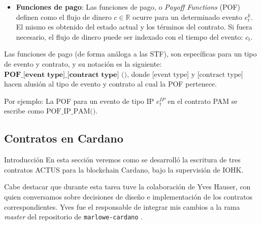 \documentclass{beamer}
\begin{document}
\begin{frame}
    \begin{itemize}
        \item \textbf{Funciones de pago}: Las funciones de pago, o \textit{Payoff Functions} (POF) definen como el flujo de dinero $c \in\mathbb{R}$ ocurre para un determinado evento $e^k_t$. El mismo es obtenido del estado actual y los términos del contrato. Si fuera necesario, el flujo de dinero puede ser indexado con el tiempo del evento: $c_t$.
    \end{itemize}
    \pause
    \vfill
    Las funciones de pago (de forma análoga a las STF), son específicas para un tipo de evento y contrato, y su notación es la siguiente: $\textbf{POF\_[event type]\_[contract type] ()}$, donde $\text{[event type]}$ y $\text{[contract type]}$ hacen alusión al tipo de evento y contrato al cual la POF pertenece.
    \medskip
    \pause

    Por ejemplo: La POF para un evento de tipo IP $e^{IP}_t$ en el contrato PAM se escribe como $\text{POF\_IP\_PAM()}$.

\end{frame}

\subsection{Contratos en Cardano}

\begin{frame}{Introducción}
En esta sección veremos como se desarrolló la escritura de tres contratos ACTUS para la blockchain Cardano, bajo la supervisión de IOHK.\@

\vfill

Cabe destacar que durante esta tarea tuve la colaboración de Yves Hauser, con quien conversamos sobre decisiones de diseño e implementación de los contratos correspondientes. Yves fue el responsable de integrar mis cambios a la rama \textit{master} del repositorio de \texttt{marlowe-cardano} \cite{marlowe-cardano-github}. %


\end{frame}
\end{document}
